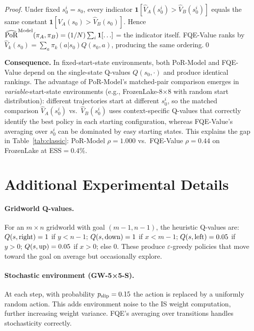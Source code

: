 \documentclass[10pt]{article}
\theoremstyle{plain}
\theoremstyle{definition}
\theoremstyle{remark}
\newcommand{\PoR}{\mathrm{PoR}}
\newcommand{\piA}{\pi_A}
\newcommand{\piB}{\pi_B}
\begin{document}
\begin{proof}
  Under fixed $s_0^i=s_0$, every indicator $\mathbf{1}[\hat{V}_A(s_0^i)>\hat{V}_B(s_0^i)]$
  equals the same constant $\mathbf{1}[\hat{V}_A(s_0)>\hat{V}_B(s_0)]$.
  Hence $\widehat{\PoR}^{\rm Model}(\piA,\piB)=(1/N)\sum_i\mathbf{1}[\ldots]$
  = the indicator itself.  FQE-Value ranks by $\hat{V}_k(s_0)=\sum_a\pi_k(a|s_0)Q(s_0,a)$,
  producing the same ordering.\qed
\end{proof}

\noindent
\textbf{Consequence.}  In fixed-start-state environments, both PoR-Model and
FQE-Value depend on the single-state Q-values $Q(s_0,\cdot)$ and produce
identical rankings.  The advantage of PoR-Model's matched-pair comparison
emerges in \emph{variable}-start-state environments (e.g., FrozenLake-8$\times$8
with random start distribution): different trajectories start at different $s_0^i$,
so the matched comparison $\hat{V}_A(s_0^i)$ vs.\ $\hat{V}_B(s_0^i)$ uses
context-specific Q-values that correctly identify the best policy in each
starting configuration, whereas FQE-Value's averaging over $s_0^i$ can be
dominated by easy starting states.  This explains the gap in Table~\ref{tab:classic}:
PoR-Model $\rho=1.000$ vs.\ FQE-Value $\rho=0.44$ on FrozenLake at ESS$=0.4\%$.

\section{Additional Experimental Details}
\label{app:exp_details}

\paragraph{Gridworld Q-values.}
For an $m\times n$ gridworld with goal $(m{-}1,n{-}1)$, the heuristic Q-values
are: $Q(s,{\rm right})=1$ if $y<n{-}1$; $Q(s,{\rm down})=1$ if $x<m{-}1$;
$Q(s,{\rm left})=0.05$ if $y>0$; $Q(s,{\rm up})=0.05$ if $x>0$; else $0$.
These produce $\varepsilon$-greedy policies that move toward the goal on
average but occasionally explore.

\paragraph{Stochastic environment (GW-5×5-S).}
At each step, with probability $p_{\rm slip}=0.15$ the action is replaced by
a uniformly random action.  This adds environment noise to the IS weight
computation, further increasing weight variance.  FQE's averaging over
transitions handles stochasticity correctly.
\end{document}
